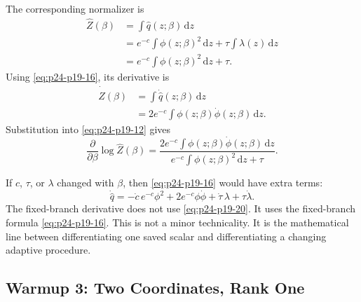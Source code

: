 \documentclass[11pt]{article}
\numberwithin{equation}{section}
\newcommand{\dd}{\,\mathrm d}
\begin{document}
The corresponding normalizer is
\begin{equation}
\begin{aligned}
    \widehat Z(\beta)
    &=
    \int \widehat q(z;\beta)\dd z\\
    &=
    e^{-c}\int \phi(z;\beta)^2\dd z
    +
    \tau\int\lambda(z)\dd z\\
    &=
    e^{-c}\int \phi(z;\beta)^2\dd z+\tau.
\end{aligned}
\label{eq:p24-p19-17}
\end{equation}
Using \eqref{eq:p24-p19-16}, its derivative is
\begin{equation}
\begin{aligned}
    \dot{\widehat Z}(\beta)
    &=
    \int \dot{\widehat q}(z;\beta)\dd z\\
    &=
    2e^{-c}
    \int \phi(z;\beta)\dot\phi(z;\beta)\dd z.
\end{aligned}
\label{eq:p24-p19-18}
\end{equation}
Substitution into \eqref{eq:p24-p19-12} gives
\begin{equation}
    \frac{\partial}{\partial\beta}\log\widehat Z(\beta)
    =
    \frac{
    2e^{-c}\int \phi(z;\beta)\dot\phi(z;\beta)\dd z}
    {e^{-c}\int\phi(z;\beta)^2\dd z+\tau}.
    \label{eq:p24-p19-19}
\end{equation}

If \(c\), \(\tau\), or \(\lambda\) changed with \(\beta\), then \eqref{eq:p24-p19-16} would have
extra terms:
\begin{equation}
    \dot{\widehat q}
    =
    -\dot c\,e^{-c}\phi^2
    +
    2e^{-c}\phi\dot\phi
    +
    \dot\tau\,\lambda
    +
    \tau\dot\lambda.
    \label{eq:p24-p19-20}
\end{equation}
The fixed-branch derivative does not use \eqref{eq:p24-p19-20}.  It uses the fixed-branch
formula \eqref{eq:p24-p19-16}.  This is not a minor technicality.  It is the mathematical line
between differentiating one saved scalar and differentiating a changing
adaptive procedure.

\subsection{Warmup 3: Two Coordinates, Rank One}
\end{document}
